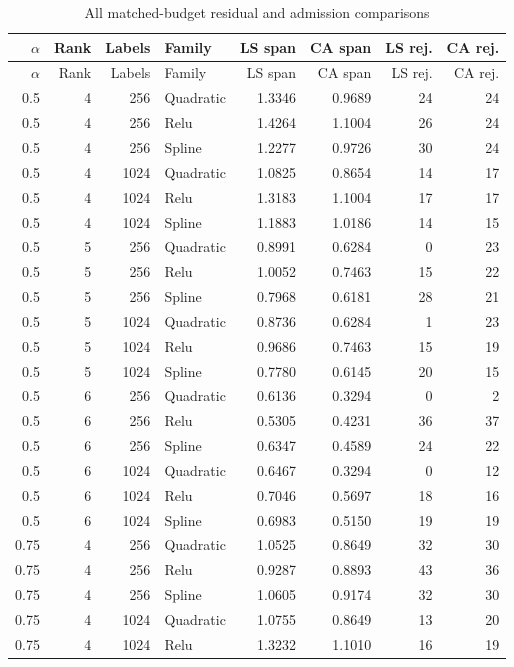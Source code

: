\begin{longtable}{rrrlrrrr}
\caption{All matched-budget residual and admission comparisons}\label{tab:budgets97}\\
\toprule $\alpha$ & Rank & Labels & Family & LS span & CA span & LS rej. & CA rej. \\ \midrule\endfirsthead
\toprule $\alpha$ & Rank & Labels & Family & LS span & CA span & LS rej. & CA rej. \\ \midrule\endhead
0.5 & 4 & 256 & Quadratic & 1.3346 & 0.9689 & 24 & 24 \\
0.5 & 4 & 256 & Relu & 1.4264 & 1.1004 & 26 & 24 \\
0.5 & 4 & 256 & Spline & 1.2277 & 0.9726 & 30 & 24 \\
0.5 & 4 & 1024 & Quadratic & 1.0825 & 0.8654 & 14 & 17 \\
0.5 & 4 & 1024 & Relu & 1.3183 & 1.1004 & 17 & 17 \\
0.5 & 4 & 1024 & Spline & 1.1883 & 1.0186 & 14 & 15 \\
0.5 & 5 & 256 & Quadratic & 0.8991 & 0.6284 & 0 & 23 \\
0.5 & 5 & 256 & Relu & 1.0052 & 0.7463 & 15 & 22 \\
0.5 & 5 & 256 & Spline & 0.7968 & 0.6181 & 28 & 21 \\
0.5 & 5 & 1024 & Quadratic & 0.8736 & 0.6284 & 1 & 23 \\
0.5 & 5 & 1024 & Relu & 0.9686 & 0.7463 & 15 & 19 \\
0.5 & 5 & 1024 & Spline & 0.7780 & 0.6145 & 20 & 15 \\
0.5 & 6 & 256 & Quadratic & 0.6136 & 0.3294 & 0 & 2 \\
0.5 & 6 & 256 & Relu & 0.5305 & 0.4231 & 36 & 37 \\
0.5 & 6 & 256 & Spline & 0.6347 & 0.4589 & 24 & 22 \\
0.5 & 6 & 1024 & Quadratic & 0.6467 & 0.3294 & 0 & 12 \\
0.5 & 6 & 1024 & Relu & 0.7046 & 0.5697 & 18 & 16 \\
0.5 & 6 & 1024 & Spline & 0.6983 & 0.5150 & 19 & 19 \\
0.75 & 4 & 256 & Quadratic & 1.0525 & 0.8649 & 32 & 30 \\
0.75 & 4 & 256 & Relu & 0.9287 & 0.8893 & 43 & 36 \\
0.75 & 4 & 256 & Spline & 1.0605 & 0.9174 & 32 & 30 \\
0.75 & 4 & 1024 & Quadratic & 1.0755 & 0.8649 & 13 & 20 \\
0.75 & 4 & 1024 & Relu & 1.3232 & 1.1010 & 16 & 19 \\

\end{longtable}
